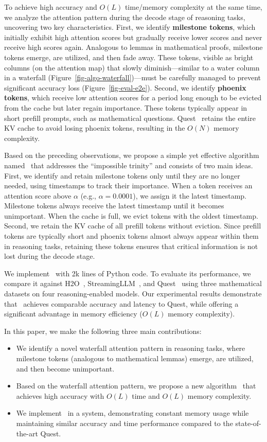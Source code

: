 To achieve high accuracy and $O(L)$ time/memory complexity at the same time, we analyze the attention pattern during the decode stage of reasoning tasks, uncovering two key characteristics. First, we identify \textbf{milestone tokens}, which initially exhibit high attention scores but gradually receive lower scores and never receive high scores again. Analogous to lemmas in mathematical proofs, milestone tokens emerge, are utilized, and then fade away. These tokens, visible as bright columns (on the attention map) that slowly diminish---similar to a water column in a waterfall (Figure~\ref{fig-algo-waterfall})---must be carefully managed to prevent significant accuracy loss (Figure~\ref{fig-eval-e2e}). Second, we identify \textbf{phoenix tokens}, which receive low attention scores for a period long enough to be evicted from the cache but later regain importance. These tokens typically appear in short prefill prompts, such as mathematical questions. Quest~\cite{tang2024quest} retains the entire KV cache to avoid losing phoenix tokens, resulting in the $O(N)$ memory complexity.

Based on the preceding observations, we propose a simple yet effective algorithm named \algo\ that addresses the ``impossible trinity'' and consists of two main ideas. First, we identify and retain milestone tokens only until they are no longer needed, using timestamps to track their importance. When a token receives an attention score above $\alpha$ (e.g., $\alpha=0.0001$), we assign it the latest timestamp. Milestone tokens always receive the latest timestamp until it becomes unimportant. When the cache is full, we evict tokens with the oldest timestamp. Second, we retain the KV cache of all prefill tokens without eviction. Since prefill tokens are typically short and phoenix tokens almost always appear within them in reasoning tasks, retaining these tokens ensures that critical information is not lost during the decode stage.

We implement \algo\ with 2k lines of Python code. To evaluate its performance, we compare it against H2O~\cite{zhang2023h2o}, StreamingLLM~\cite{xiao2023sink}, and Quest~\cite{tang2024quest} using three mathematical datasets on four reasoning-enabled models. Our experimental results demonstrate that \algo\ achieves comparable accuracy and latency to Quest, while offering a significant advantage in memory efficiency ($O(L)$ memory complexity).

In this paper, we make the following three main contributions: 

\begin{itemize}
    \item We identify a novel waterfall attention pattern in reasoning tasks, where milestone tokens (analogous to mathematical lemmas) emerge, are utilized, and then become unimportant.
    \item Based on the waterfall attention pattern, we propose a new algorithm \algo\ that achieves high accuracy with $O(L)$ time and $O(L)$ memory complexity. 
    \item We implement \algo\ in a system, demonstrating constant memory usage while maintaining similar accuracy and time performance compared to the state-of-the-art Quest.
\end{itemize}